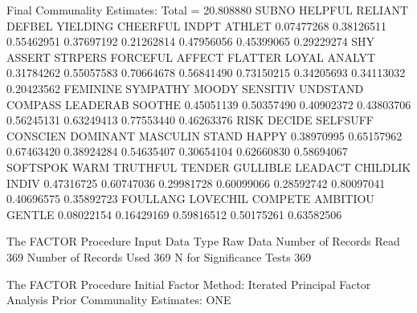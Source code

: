\documentclass{article}
\begin{document}
\begin{Woutput}
                        Final Communality Estimates: Total = 20.808880
     SUBNO     HELPFUL     RELIANT      DEFBEL    YIELDING    CHEERFUL       INDPT      ATHLET
0.07477268  0.38126511  0.55462951  0.37697192  0.21262814  0.47956056  0.45399065  0.29229274
       SHY      ASSERT     STRPERS    FORCEFUL      AFFECT     FLATTER       LOYAL      ANALYT
0.31784262  0.55057583  0.70664678  0.56841490  0.73150215  0.34205693  0.34113032  0.20423562
  FEMININE    SYMPATHY       MOODY    SENSITIV    UNDSTAND     COMPASS    LEADERAB      SOOTHE
0.45051139  0.50357490  0.40902372  0.43803706  0.56245131  0.63249413  0.77553440  0.46263376
      RISK      DECIDE    SELFSUFF    CONSCIEN    DOMINANT    MASCULIN       STAND       HAPPY
0.38970995  0.65157962  0.67463420  0.38924284  0.54635407  0.30654104  0.62660830  0.58694067
  SOFTSPOK        WARM    TRUTHFUL      TENDER    GULLIBLE     LEADACT    CHILDLIK       INDIV
0.47316725  0.60747036  0.29981728  0.60099066  0.28592742  0.80097041  0.40696575  0.35892723
  FOULLANG        LOVECHIL         COMPETE        AMBITIOU          GENTLE
0.08022154      0.16429169      0.59816512      0.50175261      0.63582506

The FACTOR Procedure
Input Data Type                    Raw Data
Number of Records Read                  369
Number of Records Used                  369
N for Significance Tests                369

The FACTOR Procedure
Initial Factor Method: Iterated Principal Factor Analysis
Prior Communality Estimates: ONE


\end{Woutput}
\end{document}
